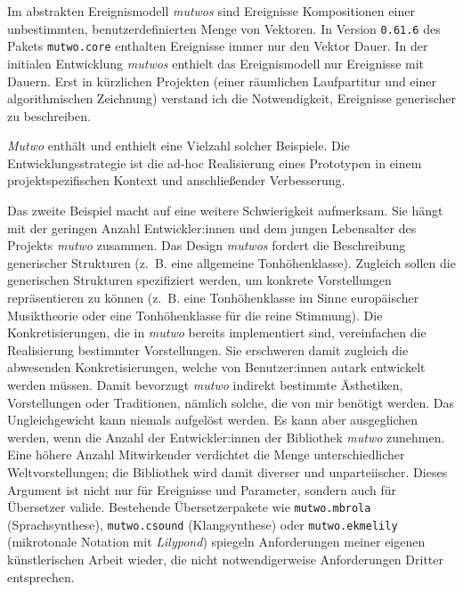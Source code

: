 \documentclass[12pt,a4paper,ngerman]{article}
\begin{document}
\smallskip

Im abstrakten Ereignismodell \emph{mutwos} sind Ereignisse Kompositionen einer unbestimmten, benutzerdefinierten Menge von Vektoren.
In Version \texttt{0.61.6} des Pakets \texttt{mutwo.core} enthalten Ereignisse immer nur den Vektor Dauer.
In der initialen Entwicklung \emph{mutwos} enthielt das Ereignismodell nur Ereignisse mit Dauern.
Erst in kürzlichen Projekten (einer räumlichen Laufpartitur und einer algorithmischen Zeichnung) verstand ich die Notwendigkeit, Ereignisse generischer zu beschreiben.

\smallskip

\emph{Mutwo} enthält und enthielt eine Vielzahl solcher Beispiele.
Die Entwicklungsstrategie ist die ad-hoc Realisierung eines Prototypen in einem projektspezifischen Kontext und anschließender Verbesserung.

\bigskip

Das zweite Beispiel macht auf eine weitere Schwierigkeit aufmerksam.
Sie hängt mit der geringen Anzahl Entwickler:innen und dem jungen Lebensalter des Projekts \emph{mutwo} zusammen.
Das Design \emph{mutwos} fordert die Beschreibung generischer Strukturen (z.~B. eine allgemeine Tonhöhenklasse).
Zugleich sollen die generischen Strukturen spezifiziert werden, um konkrete Vorstellungen repräsentieren zu können (z.~B. eine Tonhöhenklasse im Sinne europäischer Musiktheorie oder eine Tonhöhenklasse für die reine Stimmung).
Die Konkretisierungen, die in \emph{mutwo} bereits implementiert sind, vereinfachen die Realisierung bestimmter Vorstellungen.
Sie erschweren damit zugleich die abwesenden Konkretisierungen, welche von Benutzer:innen autark entwickelt werden müssen.
Damit bevorzugt \emph{mutwo} indirekt bestimmte Ästhetiken, Vorstellungen oder Traditionen, nämlich solche, die von mir benötigt werden.
Das Ungleichgewicht kann niemals aufgelöst werden.
Es kann aber ausgeglichen werden, wenn die Anzahl der Entwickler:innen der Bibliothek \emph{mutwo} zunehmen.
Eine höhere Anzahl Mitwirkender verdichtet die Menge unterschiedlicher Weltvorstellungen; die Bibliothek wird damit diverser und unparteiischer.
Dieses Argument ist nicht nur für Ereignisse und Parameter, sondern auch für Übersetzer valide.
Bestehende Übersetzerpakete wie \texttt{mutwo.mbrola} (Sprachsynthese), \texttt{mutwo.csound} (Klangsynthese) oder \texttt{mutwo.ekmelily} (mikrotonale Notation mit \emph{Lilypond}) spiegeln Anforderungen meiner eigenen künstlerischen Arbeit wieder, die nicht notwendigerweise Anforderungen Dritter entsprechen.
\end{document}
